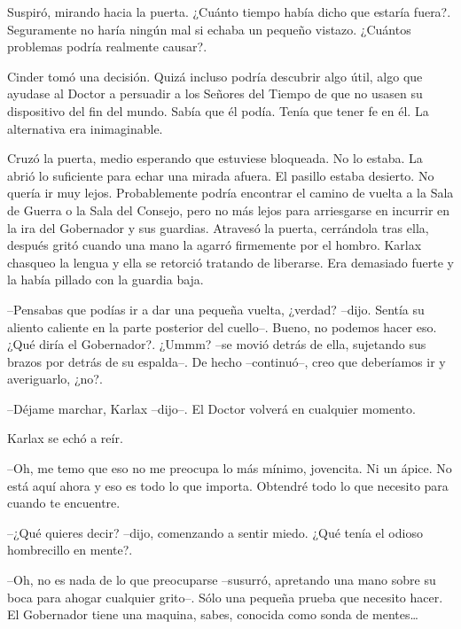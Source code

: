 Suspiró, mirando hacia la puerta. ¿Cuánto tiempo había dicho que estaría fuera?. Seguramente no haría ningún mal si echaba un pequeño vistazo. ¿Cuántos problemas podría realmente causar?. 

Cinder tomó una decisión. Quizá incluso podría descubrir algo útil, algo que ayudase al Doctor a persuadir a los Señores del Tiempo de que no usasen su dispositivo del fin del mundo. Sabía que él podía. Tenía que tener fe en él. La alternativa era inimaginable. 

Cruzó la puerta, medio esperando que estuviese bloqueada. No lo estaba. La abrió lo suficiente para echar una mirada afuera. El pasillo estaba desierto. No quería ir muy lejos. Probablemente podría encontrar el camino de vuelta a la Sala de Guerra o la Sala del Consejo, pero no más lejos para arriesgarse en incurrir en la ira del Gobernador y sus guardias. Atravesó la puerta, cerrándola tras ella, después gritó cuando una mano la agarró firmemente por el hombro. Karlax chasqueo la lengua y ella se retorció tratando de liberarse. Era demasiado fuerte y la había pillado con la guardia baja. 



--Pensabas que podías ir a dar una pequeña vuelta, ¿verdad? --dijo. Sentía su aliento caliente en la parte posterior del cuello--. Bueno, no podemos hacer eso. ¿Qué diría el Gobernador?. ¿Ummm? --se movió detrás de ella, sujetando sus brazos por detrás de su espalda--. De hecho --continuó--, creo que deberíamos ir y averiguarlo, ¿no?.

 

--Déjame marchar, Karlax --dijo--. El Doctor volverá en cualquier momento. 



Karlax se echó a reír. 



--Oh, me temo que eso no me preocupa lo más mínimo, jovencita. Ni un ápice. No está aquí ahora y eso es todo lo que importa. Obtendré todo lo que necesito para cuando te encuentre. 



--¿Qué quieres decir? --dijo, comenzando a sentir miedo. ¿Qué tenía el odioso hombrecillo en mente?.

 

--Oh, no es nada de lo que preocuparse --susurró, apretando una mano sobre su boca para ahogar cualquier grito--. Sólo una pequeña prueba que necesito hacer. El Gobernador tiene una maquina, sabes, conocida como sonda de mentes… 




